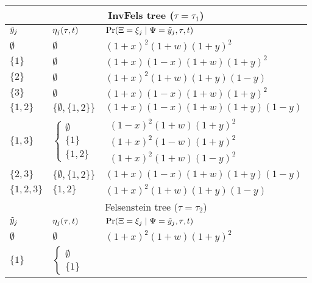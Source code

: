 \begin{table}
\centering
\begin{tabular}{|l|ll|}
    \multicolumn{3}{c}{InvFels tree ($\tau=\tau_1$)}\\
    \hline
    $\tilde{y}_j$    & $\eta_j(\tau, t)$ & $\Pr(\Xi=\xi_j \mid \Psi=\tilde{y}_j,\tau,t)$\\
    \hline
    $\emptyset$&
    $\emptyset$&
    $(1+x)^2   (1+w)(1+y)^2$\\
     $\{1\}$    &
    $\emptyset$&
    $(1+x)(1-x)(1+w)(1+y)^2$\\
     $\{2\}$    &
    $\emptyset$&
    $(1+x)^2   (1+w)(1+y)(1-y)$\\
     $\{3\}$    &
    $\emptyset$&
    $(1+x)(1-x)(1+w)(1+y)^2$\\
    $\{1,2\}$  &
    $\{\emptyset,\{1,2\}\}$&
    $(1+x)(1-x)(1+w)(1+y)(1-y)$\\
    $\{1,3\}$  &
    $\left\{\begin{array}{l}
                    \emptyset\\
                    \{1\}\\
                    \{1,2\}
                \end{array}\right.$&
    $\begin{array}{l}
                    (1-x)^2   (1+w)(1+y)^2\\
                    (1+x)^2   (1-w)(1+y)^2\\
                    (1+x)^2   (1+w)(1-y)^2
                \end{array}$\\
    $\{2,3\}$  &
                $\{\emptyset,\{1,2\}\}$&
                $(1+x)(1-x)(1+w)(1+y)(1-y)$\\
    $\{1,2,3\}$&
                $\{1,2\}$&
                $(1+x)^2   (1+w)(1+y)(1-y)$\\
    \hline
    \multicolumn{3}{c}{Felsenstein tree ($\tau=\tau_2$)}\\
    \hline
    $\tilde{y}_j$    & $\eta_j(\tau, t)$ & $\Pr(\Xi=\xi_j \mid \Psi=\tilde{y}_j,\tau,t)$\\
    \hline
    $\emptyset$       &$\emptyset$&$(1+x)^2   (1+w)(1+y)^2$\\
    $\{1\}$          &
    $\left\{\begin{array}{l}
                    \emptyset\\
                    \{1\}
                \end{array}\right.$&

\end{tabular}
\end{table}
